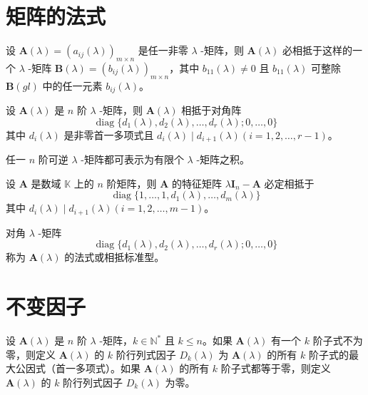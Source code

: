 \section{矩阵的法式}

\begin{lemma}
    设 $\bm{A}(\lambda) = (a_{ij}(\lambda))_{m \times n}$ 是任一非零 $\lambda$ -矩阵，则 $\bm{A}(\lambda)$ 必相抵于这样的一个 $\lambda$ -矩阵 $\bm{B}(\lambda) = (b_{ij}(\lambda))_{m \times n}$，其中 $b_{11}(\lambda) \neq 0$ 且 $b_{11}(\lambda)$ 可整除 $\bm{B}(gl)$ 中的任一元素 $b_{ij}(\lambda)$。
\end{lemma}

\begin{theorem}
    设 $\bm{A}(\lambda)$ 是 $n$ 阶 $\lambda$ -矩阵，则 $\bm{A}(\lambda)$ 相抵于对角阵
    \[
        \operatorname{diag}\{ d_{1}(\lambda), d_{2}(\lambda), \ldots, d_{r}(\lambda); 0, \ldots, 0 \}
    \]
    其中 $d_{i}(\lambda)$ 是非零首一多项式且 $d_{i}(\lambda) \mid d_{i + 1}(\lambda)(i = 1, 2, \ldots, r - 1)$。
\end{theorem}

\begin{corollary}
    任一 $n$ 阶可逆 $\lambda$ -矩阵都可表示为有限个 $\lambda$ -矩阵之积。
\end{corollary}

\begin{corollary}
    设 $\bm{A}$ 是数域 $\mathbb{K}$ 上的 $n$ 阶矩阵，则 $\bm{A}$ 的特征矩阵 $\lambda \bm{I}_{n} - \bm{A}$ 必定相抵于
    \[
        \operatorname{diag}\{ 1, \ldots, 1, d_{1}(\lambda), \ldots, d_{m}(\lambda) \}
    \]
    其中 $d_{i}(\lambda) \mid d_{i + 1}(\lambda)(i = 1, 2, \ldots, m - 1)$。
\end{corollary}


\begin{definition}
    对角 $\lambda$ -矩阵
    \[
        \operatorname{diag}\{ d_{1}(\lambda), d_{2}(\lambda), \ldots, d_{r}(\lambda); 0, \ldots, 0 \}
    \]
    称为 $\bm{A}(\lambda)$ 的法式或相抵标准型。
\end{definition}



\section{不变因子}

\begin{definition}
    设 $\bm{A}(\lambda)$ 是 $n$ 阶 $\lambda$ -矩阵，$k \in \mathbb{N}^*$ 且 $k \leqslant n$。如果 $\bm{A}(\lambda)$ 有一个 $k$ 阶子式不为零，则定义 $\bm{A}(\lambda)$ 的 $k$ 阶行列式因子 $D_{k}(\lambda)$ 为 $\bm{A}(\lambda)$ 的所有 $k$ 阶子式的最大公因式（首一多项式）。如果 $\bm{A}(\lambda)$ 的所有 $k$ 阶子式都等于零，则定义 $\bm{A}(\lambda)$ 的 $k$ 阶行列式因子 $D_{k}(\lambda)$ 为零。
\end{definition}

